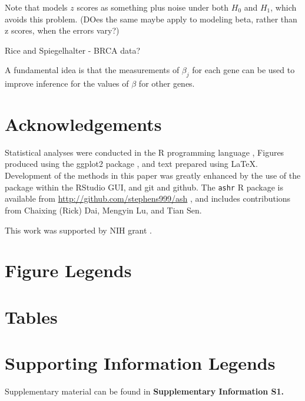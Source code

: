 \documentclass[11pt]{article}
\begin{document}
Note that \cite{muralidharan2010empirical} models $z$ scores as something plus noise under both $H_0$ and $H_1$, which
avoids this problem. (DOes the same maybe apply to modeling beta, rather than z scores, when the errors vary?)

Rice and Spiegelhalter - BRCA data?

A fundamental idea is
that the measurements of $\beta_j$ for each gene can be used to improve inference for the values of $\beta$ for other genes.


\section*{Acknowledgements}

Statistical analyses were conducted in the {\sf R} programming language \cite{Rcore:2012}, Figures produced using the ggplot2 package \cite{ggplot2}, and text
prepared using \LaTeX. Development of the methods in this paper was greatly enhanced by the use of the \cite{knitr} package within the RStudio GUI, and 
git and github. The {\tt ashr} R package is available from \url{http://github.com/stephens999/ash} , and includes contributions 
from Chaixing (Rick) Dai, Mengyin Lu, and Tian Sen. 

This work was supported by NIH grant .




\section*{Figure Legends}


\clearpage

\section*{Tables}

\section*{Supporting Information Legends}

Supplementary material can be found in {\bf Supplementary Information S1.}
\end{document}
